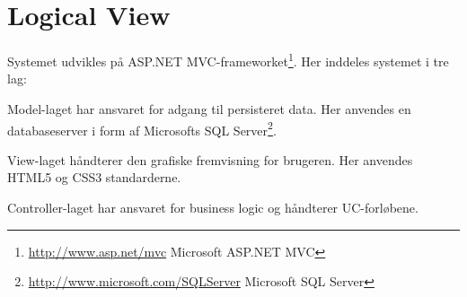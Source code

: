 \section{Logical View}\label{sec:LogicalView}
Systemet udvikles på ASP.NET MVC-frameworket\footnote{\url{http://www.asp.net/mvc} Microsoft ASP.NET MVC}. Her inddeles systemet i tre lag:


Model-laget har ansvaret for adgang til persisteret data. Her anvendes en databaseserver i form af Microsofts SQL Server\footnote{\url{http://www.microsoft.com/SQLServer} Microsoft SQL Server}.

View-laget håndterer den grafiske fremvisning for brugeren. Her anvendes HTML5 og CSS3 standarderne.

Controller-laget har ansvaret for business logic og håndterer UC-forløbene.